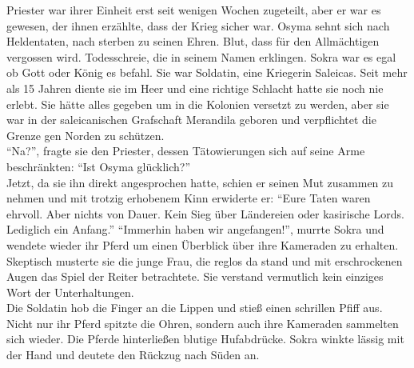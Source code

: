 Priester war ihrer Einheit erst seit wenigen Wochen zugeteilt, aber er war es gewesen, der ihnen 
erzählte, dass der Krieg sicher war. Osyma sehnt sich nach Heldentaten, nach sterben zu seinen 
Ehren. Blut, dass für den Allmächtigen vergossen wird. Todesschreie, die in seinem Namen erklingen. 
Sokra war es egal ob Gott oder König es befahl. Sie war Soldatin, eine Kriegerin Saleicas. Seit 
mehr als 15 Jahren diente sie im Heer und eine richtige Schlacht hatte sie noch nie erlebt. Sie 
hätte alles gegeben um in die Kolonien versetzt zu werden, aber sie war in der saleicanischen 
Grafschaft Merandila geboren und verpflichtet die Grenze gen Norden zu schützen.\\
``Na?'', fragte sie den Priester, dessen Tätowierungen sich auf seine Arme beschränkten: ``Ist 
Osyma glücklich?''\\
Jetzt, da sie ihn direkt angesprochen hatte, schien er seinen Mut zusammen zu nehmen und mit 
trotzig erhobenem Kinn erwiderte er: ``Eure Taten waren ehrvoll. Aber nichts von Dauer. Kein Sieg 
über Ländereien oder kasirische Lords. Lediglich ein Anfang.''
``Immerhin haben wir angefangen!'', murrte Sokra und wendete wieder ihr Pferd um einen Überblick 
über ihre Kameraden zu erhalten. Skeptisch musterte sie die junge Frau, die reglos da 
stand und mit erschrockenen Augen das Spiel der Reiter betrachtete. Sie verstand vermutlich kein 
einziges Wort der Unterhaltungen. \\
Die Soldatin hob die Finger an die Lippen und stieß einen schrillen Pfiff aus. Nicht nur ihr Pferd 
spitzte die Ohren, sondern auch ihre Kameraden sammelten sich wieder. Die Pferde hinterließen 
blutige Hufabdrücke. Sokra winkte lässig mit der Hand und deutete den Rückzug nach Süden an.\\

